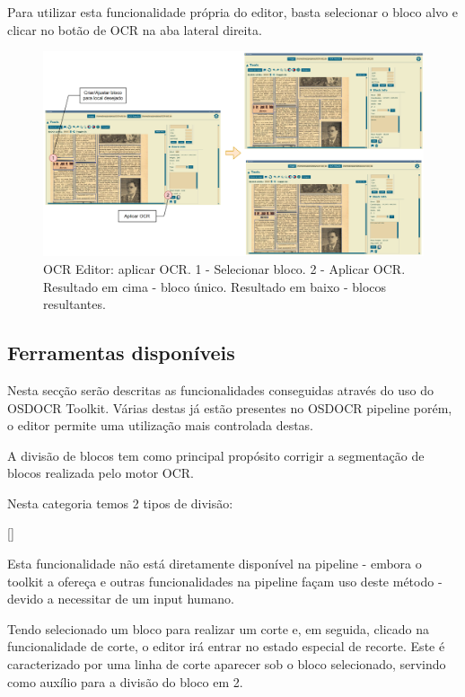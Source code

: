 Para utilizar esta funcionalidade própria do editor, basta selecionar o bloco alvo e clicar no botão de OCR na aba lateral direita.


\begin{figure}[H]
	\centering
	\hspace*{-1.8cm}
	\includegraphics[width=1.2\textwidth]{images/ilustracoes/ocr_editor_apply_ocr.png}
	\caption{OCR Editor: aplicar OCR. 1 - Selecionar bloco. 2 - Aplicar OCR. Resultado em cima - bloco único. Resultado em baixo - blocos resultantes.}
	\label{fig:ocr_editor_apply_ocr}
\end{figure}




\subsection{Ferramentas disponíveis}

Nesta secção serão descritas as funcionalidades conseguidas através do uso do OSDOCR Toolkit. Várias destas já estão presentes no OSDOCR pipeline porém, o editor permite uma utilização mais controlada destas.


A divisão de blocos tem como principal propósito corrigir a segmentação de blocos realizada pelo motor OCR.

Nesta categoria temos 2 tipos de divisão:

[\normalsize]

Esta funcionalidade não está diretamente disponível na pipeline - embora o toolkit a ofereça e outras funcionalidades na pipeline façam uso deste método - devido a necessitar de um input humano.

Tendo selecionado um bloco para realizar um corte e, em seguida, clicado na funcionalidade de corte, o editor irá entrar no estado especial de recorte. Este é caracterizado por uma linha de corte aparecer sob o bloco selecionado, servindo como auxílio para a divisão do bloco em 2.


